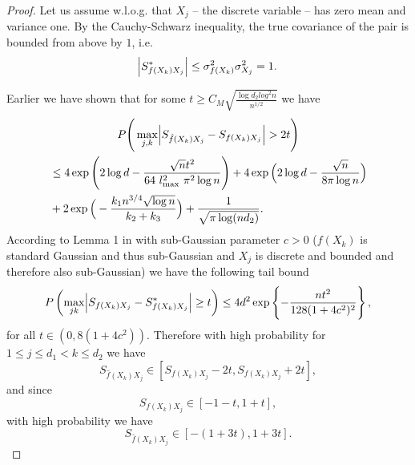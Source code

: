 \begin{proof}
    Let us assume w.l.o.g. that $X_j$ -- the discrete variable -- has zero mean and variance one. By the Cauchy-Schwarz inequality, the true covariance of the pair is bounded from above by $1$, i.e.
    \begin{equation*}
        \abs{S^*_{f(X_k)X_j}} \leq \sigma^{2}_{f(X_k)} \sigma^{2}_{X_j} = 1.
    \end{equation*}

    Earlier we have shown that for some $t \geq C_M\sqrt{\frac{\log d_2 log^2 n}{n^{1/2}}}$ we have
    \begin{multline}
        P\Bigg(\max_{j,k} \abs{S_{\hat{f}(X_k)X_j} - S_{f(X_k)X_j}} > 2t \Bigg) \\
        \begin{aligned}
        &\leq 4\exp\Bigg(2\log d - \frac{\sqrt{n}t^2}{64 \ l_{\max}^2 \ \pi^2 \log n}\Bigg) + 4\exp\Big(2\log d - \frac{\sqrt{n}}{8\pi\log n}\Big) \\
        &+ 2\exp\Big(- \frac{k_1 n^{3/4} \sqrt{\log n}}{k_2+ k_3} \Big) + \frac{1}{\sqrt{\pi \log(nd_2)}}.
        \end{aligned}
    \end{multline}
    According to Lemma 1 in \citet{Ravikumar11} with sub-Gaussian parameter $c > 0$ ($f(X_k)$ is standard Gaussian and thus sub-Gaussian and $X_j$ is discrete and bounded and therefore also sub-Gaussian) we have the following tail bound
    \begin{equation*}
        P\left(\max_{jk}\abs{S_{{f}(X_k)X_j} - S^*_{{f}(X_k)X_j}} \geq t \right) \leq 4d^2 \exp\left\{- \frac{nt^2}{128(1+4c^2)^2} \right\},
    \end{equation*}
    for all $t \in (0,8(1+4c^2))$.
    Therefore with high probability for $1 \leq j \leq d_1 < k \leq d_2$ we have
    \begin{equation*}
        S_{\hat{f}(X_k)X_j} \in [S_{{f}(X_k)X_j} - 2t , S_{{f}(X_k)X_j} + 2t], 
    \end{equation*}
    and since 
    \begin{equation*}
    S_{{f}(X_k)X_j} \in [-1 - t , 1 + t], 
    \end{equation*}
    with high probability we have 
    \begin{equation*}
        S_{\hat{f}(X_k)X_j} \in [-(1 + 3t), 1 + 3t].
    \end{equation*}
    

\end{proof}
